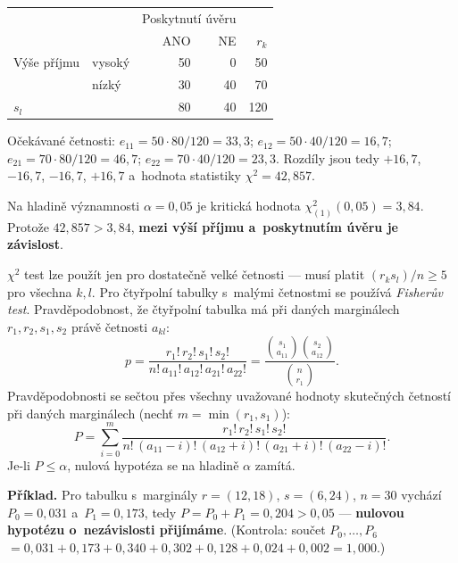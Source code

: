\documentclass[11pt,a4paper]{article}
\theoremstyle{definition}
\begin{document}
\begin{defbox}
\begin{center}
\begin{tabular}{@{}llrrr@{}}
\toprule
& & \multicolumn{2}{c}{Poskytnutí úvěru} & \\
& & ANO & NE & $r_k$ \\
\midrule
Výše příjmu & vysoký & 50 & 0 & 50 \\
            & nízký & 30 & 40 & 70 \\
\midrule
$s_l$ & & 80 & 40 & 120 \\
\bottomrule
\end{tabular}
\end{center}

Očekávané četnosti: $e_{11}=50\cdot 80/120=33{,}3$; $e_{12}=50\cdot 40/120=16{,}7$;
$e_{21}=70\cdot 80/120=46{,}7$; $e_{22}=70\cdot 40/120=23{,}3$. Rozdíly jsou tedy
$+16{,}7$, $-16{,}7$, $-16{,}7$, $+16{,}7$ a~hodnota statistiky
$\chi^2=42{,}857$.

Na hladině významnosti $\alpha=0{,}05$ je kritická hodnota $\chi^2_{(1)}(0{,}05)=3{,}84$.
Protože $42{,}857>3{,}84$, \textbf{mezi výší příjmu a~poskytnutím úvěru je závislost}.
\end{defbox}

\begin{defbox}
$\chi^2$ test lze použít jen pro dostatečně velké četnosti --- musí platit
$(r_k s_l)/n\ge 5$ pro všechna $k,l$. Pro čtyřpolní tabulky s~malými četnostmi se používá
\emph{Fisherův test}. Pravděpodobnost, že čtyřpolní tabulka má při daných marginálech
$r_1,r_2,s_1,s_2$ právě četnosti $a_{kl}$:
\[ p=\frac{r_1!\,r_2!\,s_1!\,s_2!}{n!\,a_{11}!\,a_{12}!\,a_{21}!\,a_{22}!}
     =\frac{\binom{s_1}{a_{11}}\binom{s_2}{a_{12}}}{\binom{n}{r_1}}. \]
Pravděpodobnosti se sečtou přes všechny uvažované hodnoty skutečných četností při daných
marginálech (nechť $m=\min(r_1,s_1)$):
\[ P=\sum_{i=0}^{m}\frac{r_1!\,r_2!\,s_1!\,s_2!}{n!\,(a_{11}-i)!\,(a_{12}+i)!\,(a_{21}+i)!\,(a_{22}-i)!}. \]
Je-li $P\le\alpha$, nulová hypotéza se na hladině $\alpha$ zamítá.

\textbf{Příklad.} Pro tabulku s~marginály $r=(12,18)$, $s=(6,24)$, $n=30$ vychází
$P_0=0{,}031$ a~$P_1=0{,}173$, tedy $P=P_0+P_1=0{,}204>0{,}05$ ---
\textbf{nulovou hypotézu o~nezávislosti přijímáme}. (Kontrola: součet $P_0,\dots,P_6$
$=0{,}031+0{,}173+0{,}340+0{,}302+0{,}128+0{,}024+0{,}002=1{,}000$.)
\end{defbox}
\end{document}
